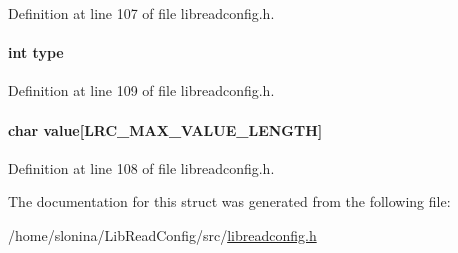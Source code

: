Definition at line 107 of file libreadconfig.h.\hypertarget{struct_l_r_c__config_options_ac765329451135abec74c45e1897abf26}{
\paragraph[{type}]{\setlength{\rightskip}{0pt plus 5cm}int {\bf type}}\hfill}
\label{struct_l_r_c__config_options_ac765329451135abec74c45e1897abf26}


Definition at line 109 of file libreadconfig.h.\hypertarget{struct_l_r_c__config_options_a643773f9f784c3c583c832c216ba32c9}{
\paragraph[{value}]{\setlength{\rightskip}{0pt plus 5cm}char {\bf value}\mbox{[}LRC\_\-MAX\_\-VALUE\_\-LENGTH\mbox{]}}\hfill}
\label{struct_l_r_c__config_options_a643773f9f784c3c583c832c216ba32c9}


Definition at line 108 of file libreadconfig.h.

The documentation for this struct was generated from the following file:\begin{DoxyCompactItemize}
\item 
/home/slonina/LibReadConfig/src/\hyperlink{libreadconfig_8h}{libreadconfig.h}\end{DoxyCompactItemize}
